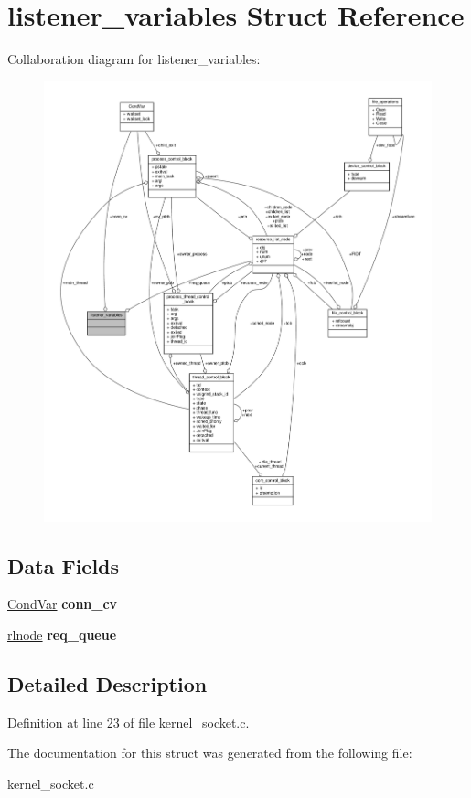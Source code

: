 \hypertarget{structlistener__variables}{}\section{listener\+\_\+variables Struct Reference}
\label{structlistener__variables}


Collaboration diagram for listener\+\_\+variables\+:
\nopagebreak
\begin{figure}[H]
\begin{center}
\leavevmode
\includegraphics[width=350pt]{structlistener__variables__coll__graph}
\end{center}
\end{figure}
\subsection*{Data Fields}
\begin{DoxyCompactItemize}
\item 
\hyperlink{structCondVar}{Cond\+Var} {\bfseries conn\+\_\+cv}\hypertarget{structlistener__variables_ac5ac99c70a80699159338ffa8c0f8ebe}{}\label{structlistener__variables_ac5ac99c70a80699159338ffa8c0f8ebe}

\item 
\hyperlink{group__rlists_ga8f6244877f7ce2322c90525217ea6e7a}{rlnode} {\bfseries req\+\_\+queue}\hypertarget{structlistener__variables_ae4ef2bc3db37d154b140bcd16d91d509}{}\label{structlistener__variables_ae4ef2bc3db37d154b140bcd16d91d509}

\end{DoxyCompactItemize}


\subsection{Detailed Description}


Definition at line 23 of file kernel\+\_\+socket.\+c.



The documentation for this struct was generated from the following file\+:\begin{DoxyCompactItemize}
\item 
kernel\+\_\+socket.\+c\end{DoxyCompactItemize}
